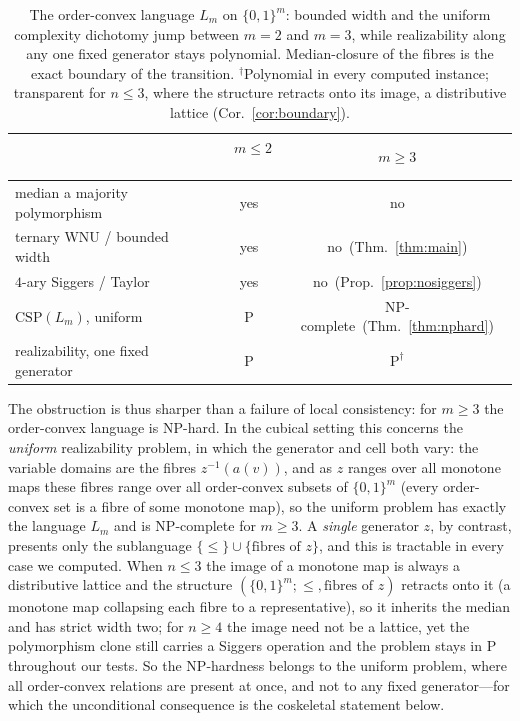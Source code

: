 \documentclass[11pt]{amsart}
\theoremstyle{plain}
\theoremstyle{definition}
\newcommand{\B}{\{0,1\}}
\begin{document}
\begin{table}[ht]
\centering
\renewcommand{\arraystretch}{1.2}
\begin{tabular}{lcc}
\hline
 & \ $m\le 2$\ & \ $m\ge 3$\ \\
\hline
median a majority polymorphism & yes & no\\
ternary WNU / bounded width & yes & no\ (Thm.~\ref{thm:main})\\
$4$-ary Siggers / Taylor & yes & no\ (Prop.~\ref{prop:nosiggers})\\
$\mathrm{CSP}(L_m)$, uniform & $\mathrm P$ & $\mathrm{NP}$-complete\ (Thm.~\ref{thm:nphard})\\
realizability, one fixed generator & $\mathrm P$ & $\mathrm P^{\dagger}$\\
\hline
\end{tabular}
\caption{The order-convex language $L_m$ on $\B^m$: bounded width and the
uniform complexity dichotomy jump between $m=2$ and $m=3$, while
realizability along any one fixed generator stays polynomial.
Median-closure of the fibres is the exact boundary of the transition.
${}^{\dagger}$Polynomial in every computed instance; transparent for
$n\le3$, where the structure retracts onto its image, a distributive
lattice (Cor.~\ref{cor:boundary}).}
\label{tab:class}
\end{table}

The obstruction is thus sharper than a failure of local consistency: for
$m\ge3$ the order-convex language is $\mathrm{NP}$-hard.  In the cubical
setting this concerns the \emph{uniform} realizability problem, in which
the generator and cell both vary: the variable domains are the fibres
$z^{-1}(a(v))$, and as $z$ ranges over all monotone maps these fibres
range over all order-convex subsets of $\B^m$ (every order-convex set is
a fibre of some monotone map), so the uniform problem has exactly the
language $L_m$ and is $\mathrm{NP}$-complete for $m\ge3$.  A
\emph{single} generator $z$, by contrast, presents only the sublanguage
$\{\le\}\cup\{\text{fibres of }z\}$, and this is tractable in every case
we computed.  When $n\le 3$ the image of a monotone map is always a
distributive lattice and the structure $(\B^m;\le,\text{fibres of }z)$
retracts onto it (a monotone map collapsing each fibre to a
representative), so it inherits the median and has strict width two; for
$n\ge 4$ the image need not be a lattice, yet the polymorphism clone
still carries a Siggers operation and the problem stays in $\mathrm P$
throughout our tests.  So the $\mathrm{NP}$-hardness belongs to the
uniform problem, where all order-convex relations are present at once,
and not to any fixed generator---for which the unconditional consequence
is the coskeletal statement below.
\end{document}
